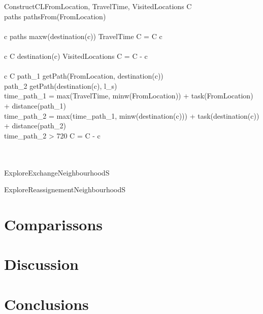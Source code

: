 \documentclass[]{report}
\begin{document}
\begin{pseudocode}{ConstructCL}{FromLocation, TravelTime, VisitedLocations}
\label{pc:construct_cl}
	C \GETS \varnothing\\
	paths \GETS pathsFrom(FromLocation)\\
	\\
	\FOREACH c \in paths \DO
		\IF maxw(destination(c)) \geq TravelTime \THEN
			C = C \cup c\\	
	\\
	\FOREACH c \in C \DO
		\IF destination(c) \in VisitedLocations \THEN
			C = C - c\\
	\\
	\FOREACH c \in C \DO
	\BEGIN
		path_{1} \GETS getPath(FromLocation, destination(c))\\
		path_{2} \GETS getPath(destination(c), l_{s})\\
		time_{path_{1}} = max(TravelTime, minw(FromLocation)) + task(FromLocation) + distance(path_{1})\\
		time_{path_{2}} = max(time_{path_{1}}, minw(destination(c))) + task(destination(c)) + distance(path_{2})\\
		\IF time_{path_{2}} > 720 \THEN
			C = C - c\\
	\END\\
	\\
\end{pseudocode}

\begin{pseudocode}{ExploreExchangeNeighbourhood}{S}
	\label{pc:exchange_neighbourhood}
\end{pseudocode}

\begin{pseudocode}{ExploreReassignementNeighbourhood}{S}
\label{pc:reassignement_neighbourhood}
\end{pseudocode}

\chapter{Comparissons}\label{ch:comparisson}

\chapter{Discussion}\label{ch:discussion}

\chapter{Conclusions}\label{ch:conclusions}
\end{document}
